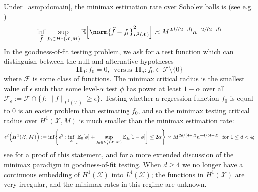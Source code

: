 \documentclass{article}
\newcommand{\1}{\mathbf{1}}
\newcommand{\Xset}{\mathcal{X}}
\newcommand{\Leb}{L}
\newcommand{\mc}[1]{\mathcal{#1}}
\newcommand{\Ebb}{\mathbb{E}}
\newcommand{\wh}[1]{\widehat{#1}}
\theoremstyle{alden}
\theoremstyle{aldenthm}
\theoremstyle{definition}
\theoremstyle{remark}
\begin{document}
Under~\ref{asmp:domain}, the minimax estimation rate over Sobolev balls is (see e.g. \citep{tsybakov2008_book})
\begin{equation}
\label{eqn:sobolev_space_estimation_minimax_rate}
\inf_{\wh{f}} \sup_{f_0 \in H^1(\Xset, M)} \Ebb\Bigl[\norm{\wh{f} - f_0}_{L^2(\Xset)}^2\Bigr] \asymp M^{2d/(2 + d)}n^{-2/(2 + d)}
\end{equation}
In the goodness-of-fit testing problem, we ask for a test function which can distinguish between the null and alternative hypotheses
\begin{equation}
\mathbf{H}_0: f_0 = 0, ~~\textrm{versus}~~ \mathbf{H}_a: f_0 \in \mc{F} \setminus \{0\}
\end{equation} 
where $\mc{F}$ is some class of functions. The minimax critical radius is the smallest value of $\epsilon$ such that some level-${\alpha}$ test $\phi$ has power at least $1 - \alpha$ over all $\mc{F}_{\epsilon} := \mc{F} \cap \{f: \|f\|_{\Leb^2(\Xset)} \geq \epsilon\}$. Testing whether a regression function $f_0$ is equal to $0$ is an easier problem than estimating $f_0$, and so the minimax testing critical radius over $H^1(\Xset,M)$ is much smaller than the minimax estimation rate:
\begin{equation}
\label{eqn:sobolev_space_testing_critical_radius}
\epsilon^2\Bigl(H^1(\Xset,M)\Bigr):= \inf\Biggl\{\epsilon^2: \inf_{\phi} \biggl[\Ebb_0[\phi] +  \sup_{f_0 \in H_{\epsilon}^1(\Xset,M)} \Ebb_{f_0}[1 - \phi]\biggr] \leq 2\alpha \Biggr\} \asymp M^{2d/(4 + d)}n^{-4/(4 + d)}~~\textrm{for $1 \leq d < 4$;}
\end{equation}
see \cite{ingster09} for a proof of this statement, and \cite{ariascastro2018} for a more extended discussion of the minimax paradigm in goodness-of-fit testing. When $d \geq 4$ we no longer have a continuous embedding of $H^1(\Xset)$ into $\Leb^4(\Xset)$; the functions in $H^1(\Xset)$ are very irregular, and the minimax rates in this regime are unknown. 
\end{document}
